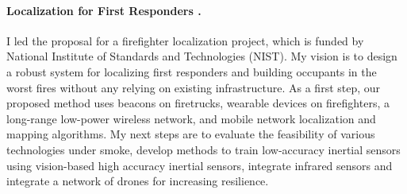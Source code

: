 \documentclass[10pt]{article}
\begin{document}
\paragraph{Localization for First Responders . }
I led the proposal for a firefighter localization project, which is funded by National Institute of Standards and Technologies (NIST). My vision is to design a robust system for localizing first responders and building occupants in the worst fires without any relying on existing infrastructure. %
As a first step, our proposed method uses beacons on firetrucks, wearable devices on firefighters, a long-range low-power wireless network, and mobile network localization and mapping algorithms. 
My next steps are to evaluate the feasibility of various technologies under smoke, develop methods to train low-accuracy inertial sensors using vision-based high accuracy inertial sensors, integrate infrared sensors and integrate a network of drones for increasing resilience. %
\end{document}
